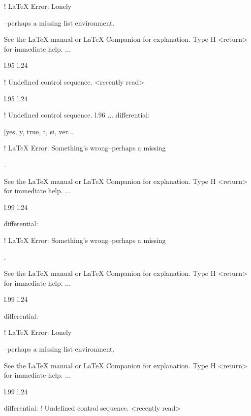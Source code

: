 {{{{{! LaTeX Error: Lonely \item--perhaps a missing list environment.

See the LaTeX manual or LaTeX Companion for explanation.
Type  H <return>  for immediate help.
 ...                                              
                                                  
l.95 l.24     \item \xmlNode
                            
! Undefined control sequence.
<recently read> \xmlNode 
                         
l.95 l.24     \item \xmlNode
                            
! Undefined control sequence.
l.96 ...                  {differential}: \xmlDesc
                                                  {[yes, y, true, t, si, ver...


! LaTeX Error: Something's wrong--perhaps a missing \item.

See the LaTeX manual or LaTeX Companion for explanation.
Type  H <return>  for immediate help.
 ...                                              
                                                  
l.99 l.24     \item \xmlNode
                            {differential}: \xmlDesc

! LaTeX Error: Something's wrong--perhaps a missing \item.

See the LaTeX manual or LaTeX Companion for explanation.
Type  H <return>  for immediate help.
 ...                                              
                                                  
l.99 l.24     \item \xmlNode
                            {differential}: \xmlDesc

! LaTeX Error: Lonely \item--perhaps a missing list environment.

See the LaTeX manual or LaTeX Companion for explanation.
Type  H <return>  for immediate help.
 ...                                              
                                                  
l.99 l.24     \item \xmlNode
                            {differential}: \xmlDesc
! Undefined control sequence.
<recently read> \xmlNode 
                         
}}}}}}
